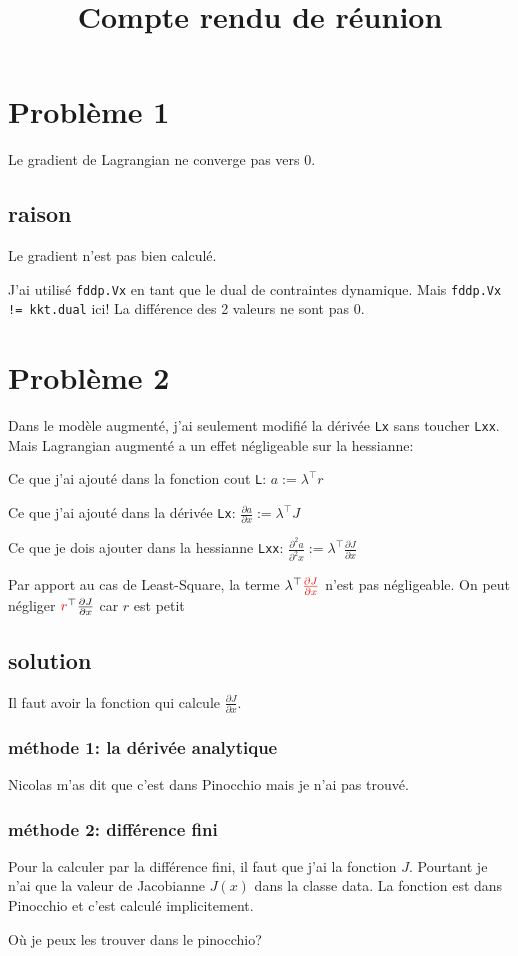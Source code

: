 \documentclass[11pt]{article} %
\title{Compte rendu de réunion}
\begin{document}
\maketitle

\section*{Problème 1}
Le gradient de Lagrangian ne converge pas vers 0.

\subsection*{raison}

Le gradient n'est pas bien calculé.

J'ai utilisé \texttt{fddp.Vx} en tant que le dual de contraintes dynamique. Mais \texttt{fddp.Vx != kkt.dual} ici! La différence des 2 valeurs ne sont pas 0.

\section*{Problème 2}
Dans le modèle augmenté, j'ai seulement modifié la dérivée \texttt{Lx} sans toucher \texttt{Lxx}. Mais Lagrangian augmenté a un effet négligeable sur la hessianne:

Ce que j'ai ajouté dans la fonction cout \texttt{L}: $a := \lambda^\top r$

Ce que j'ai ajouté dans la dérivée \texttt{Lx}: $\frac{\partial{a}}{\partial{x}} := \lambda^\top J$

\medskip
Ce que je dois ajouter dans la hessianne \texttt{Lxx}: 
$\frac{\partial^2{a}}{\partial^2{x}} := \lambda^\top \frac{\partial{J}}{\partial{x}}$

Par apport au cas de Least-Square, la terme $\lambda^\top \textcolor{red}{\frac{\partial{J}}{\partial{x}}}$ n'est pas négligeable. On peut négliger $\textcolor{red}{r}^\top \frac{\partial{J}}{\partial{x}}$ car $r$ est petit

\subsection*{solution}
Il faut avoir la fonction qui calcule $\frac{\partial{J}}{\partial{x}}$.
\subsubsection*{méthode 1: la dérivée analytique}
 Nicolas m'as dit que c'est dans Pinocchio mais je n'ai pas trouvé. 
\subsubsection*{méthode 2: différence fini}
Pour la calculer par la différence fini, il faut que j'ai la fonction $J$. Pourtant je n'ai que la valeur de Jacobianne $J(x)$ dans la classe data. La fonction est dans Pinocchio et c'est calculé implicitement.

Où je peux les trouver dans le pinocchio?
\end{document}
